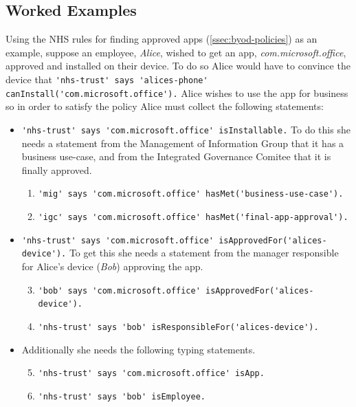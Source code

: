 \documentclass{llncs}
\begin{document}
\subsection{Worked Examples}

Using the NHS rules for finding approved apps (\autoref{ssec:byod-policies}) as an example, suppose an employee, \emph{Alice}, wished to get an app, \emph{\ttfamily com.microsoft.office}, approved and installed on their device.
To do so Alice would have to convince the device that \lstinline{'nhs-trust' says 'alices-phone' canInstall('com.microsoft.office').}
Alice wishes to use the app for business so in order to satisfy the policy Alice must collect the following statements:
\begin{itemize}
    \newcommand{\weitemsize}[0]{\footnotesize}
  \item {\weitemsize \lstinline{'nhs-trust' says 'com.microsoft.office' isInstallable.}\newline}
    To do this she needs a statement from the Management of Information Group that it has a business use-case, and from the Integrated Governance Comitee that it is finally approved.
    \begin{enumerate}\setcounter{enumi}{0}
      \item {\weitemsize \lstinline{'mig' says 'com.microsoft.office' hasMet('business-use-case').}}
      \item {\weitemsize \lstinline{'igc' says 'com.microsoft.office' hasMet('final-app-approval').}}
    \end{enumerate}
  \item {\weitemsize \lstinline{'nhs-trust' says 'com.microsoft.office' isApprovedFor('alices-device').}}
    To get this she needs a statement from the manager responsible for Alice's device (\emph{Bob}) approving the app.
    \begin{enumerate}\setcounter{enumi}{2}
      \item {\weitemsize \lstinline{'bob' says 'com.microsoft.office' isApprovedFor('alices-device').}}
      \item {\weitemsize \lstinline{'nhs-trust' says 'bob' isResponsibleFor('alices-device').}}
    \end{enumerate}
  \item Additionally she needs the following typing statements.
    \begin{enumerate}\setcounter{enumi}{4}
      \item {\weitemsize \lstinline{'nhs-trust' says 'com.microsoft.office' isApp.}} \label{item:isapp}
      \item {\weitemsize \lstinline{'nhs-trust' says 'bob' isEmployee.}}
    \end{enumerate}
\end{itemize}
\end{document}
